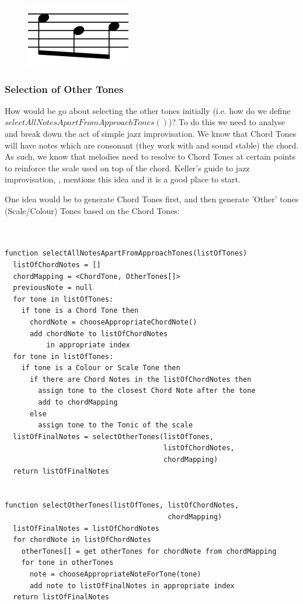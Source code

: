 \documentclass[pdftex,12pt,a4paper]{report}
\begin{document}
\begin{figure}[h]
  \centering
  \includegraphics[scale=0.4]{figure/approachenclosure.png}
  \label{fig:approachenclosure}
\end{figure}

\subsubsection{Selection of Other Tones}
How would be go about selecting the other tones initially (i.e. how do we define $selectAllNotesApartFromApproachTones()$)? To do this we need to analyse and break down the act of simple jazz improvisation. We know that Chord Tones will have notes which are consonant (they work with and sound stable) the chord. As such, we know that melodies need to resolve to Chord Tones at certain points to reinforce the scale used on top of the chord. Keller's guide to jazz improvisation, \cite{jazzkeller}, mentions this idea and it is a good place to start.

One idea would be to generate Chord Tones first, and then generate 'Other' tones (Scale/Colour) Tones based on the Chord Tones:

\begin{verbatim}


function selectAllNotesApartFromApproachTones(listOfTones)
  listOfChordNotes = []
  chordMapping = <ChordTone, OtherTones[]>
  previousNote = null
  for tone in listOfTones:
    if tone is a Chord Tone then
      chordNote = chooseAppropriateChordNote()
      add chordNote to listOfChordNotes 
          in appropriate index
  for tone in listOfTones:
    if tone is a Colour or Scale Tone then
      if there are Chord Notes in the listOfChordNotes then
        assign tone to the closest Chord Note after the tone
        add to chordMapping
      else
        assign tone to the Tonic of the scale
  listOfFinalNotes = selectOtherTones(listOfTones, 
                                      listOfChordNotes, 
                                      chordMapping)
  return listOfFinalNotes


function selectOtherTones(listOfTones, listOfChordNotes, 
                                       chordMapping)
  listOfFinalNotes = listOfChordNotes
  for chordNote in listOfChordNotes
    otherTones[] = get otherTones for chordNote from chordMapping
    for tone in otherTones
      note = chooseAppropriateNoteForTone(tone)
      add note to listOfFinalNotes in appropriate index
  return listOfFinalNotes

\end{verbatim}
\end{document}
